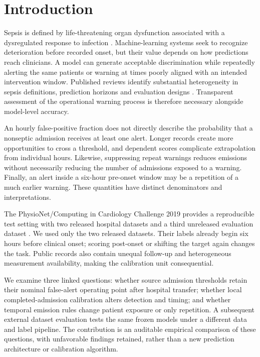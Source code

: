 \documentclass[preprint,12pt]{elsarticle}
\begin{document}
\newpage

\section{Introduction}
Sepsis is defined by life-threatening organ dysfunction associated with a dysregulated response to infection \cite{singer}. Machine-learning systems seek to recognize deterioration before recorded onset, but their value depends on how predictions reach clinicians. A model can generate acceptable discrimination while repeatedly alerting the same patients or warning at times poorly aligned with an intended intervention window. Published reviews identify substantial heterogeneity in sepsis definitions, prediction horizons and evaluation designs \cite{fleuren}. Transparent assessment of the operational warning process is therefore necessary alongside model-level accuracy.

An hourly false-positive fraction does not directly describe the probability that a nonseptic admission receives at least one alert. Longer records create more opportunities to cross a threshold, and dependent scores complicate extrapolation from individual hours. Likewise, suppressing repeat warnings reduces emissions without necessarily reducing the number of admissions exposed to a warning. Finally, an alert inside a six-hour pre-onset window may be a repetition of a much earlier warning. These quantities have distinct denominators and interpretations.

The PhysioNet/Computing in Cardiology Challenge 2019 provides a reproducible test setting with two released hospital datasets and a third unreleased evaluation dataset \cite{reyna,reynadata}. We used only the two released datasets. Their labels already begin six hours before clinical onset; scoring post-onset or shifting the target again changes the task. Public records also contain unequal follow-up and heterogeneous measurement availability, making the calibration unit consequential.

We examine three linked questions: whether source admission thresholds retain their nominal false-alert operating point after hospital transfer; whether local completed-admission calibration alters detection and timing; and whether temporal emission rules change patient exposure or only repetition. A subsequent external dataset evaluation tests the same frozen models under a different data and label pipeline. The contribution is an auditable empirical comparison of these questions, with unfavorable findings retained, rather than a new prediction architecture or calibration algorithm.
\end{document}
